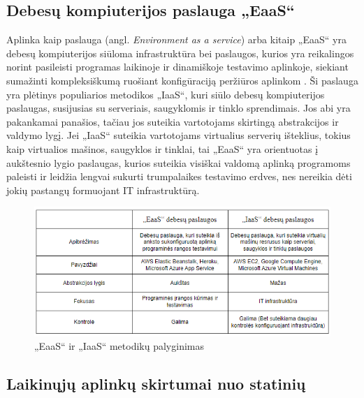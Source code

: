 \documentclass{VUMIFPSkursinis}
\begin{document}
\subsection{Debesų kompiuterijos paslauga „EaaS“}

Aplinka kaip paslauga (angl. \textit{Environment as a service}) arba kitaip 
„EaaS“ yra debesų kompiuterijos siūloma infrastruktūra bei paslaugos, kurios yra reikalingos norint pasileisti programas laikinoje ir dinamiškoje testavimo aplinkoje, siekiant sumažinti kompleksiškumą ruošiant konfigūraciją peržiūros aplinkom \cite{SaltTryliktas}. Ši paslauga yra plėtinys populiarios metodikos „IaaS“, kuri siūlo debesų kompiuterijos paslaugas, susijusias su serveriais, saugyklomis ir tinklo sprendimais. Jos abi yra pakankamai panašios, tačiau jos suteikia vartotojams skirtingą abstrakcijos ir valdymo lygį. Jei „IaaS“ suteikia vartotojams virtualius serverių išteklius, tokius kaip virtualios mašinos, saugyklos ir tinklai, tai „EaaS“ yra orientuotas į aukštesnio lygio paslaugas, kurios suteikia visiškai valdomą aplinką programoms paleisti ir leidžia lengvai sukurti trumpalaikes testavimo erdves, nes nereikia dėti jokių pastangų formuojant IT infrastruktūrą. 

\begin{figure}[H]
    \centering
    \includegraphics[scale=0.9]{img/EassvsIaas.png}
    \caption{„EaaS“ ir „IaaS“ metodikų palyginimas}
    \label{img:mlp}
\end{figure}

\subsection{Laikinųjų aplinkų skirtumai nuo statinių}
\end{document}
